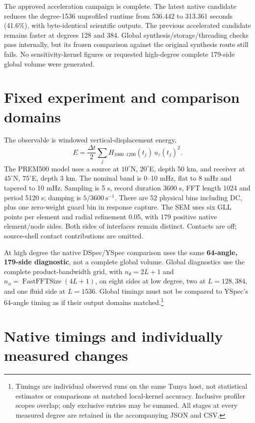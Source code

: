 \documentclass[11pt,a4paper]{article}
\begin{document}
The approved acceleration campaign is complete. The latest native candidate reduces the degree-1536 unprofiled runtime from 536.442 to 313.361 seconds (41.6\%), with byte-identical scientific outputs. The previous accelerated candidate remains faster at degrees 128 and 384. Global synthesis/storage/threading checks pass internally, but its frozen comparison against the original synthesis route still fails. No sensitivity-kernel figures or requested high-degree complete 179-side global volume were generated.
\section{Fixed experiment and comparison domains}
The observable is windowed vertical-displacement energy,
\[
E=\frac{\Delta t}{2}\sum_j H_{1000\text{--}1200}(t_j)\,u_z(t_j)^2.
\]
The PREM500 model uses a source at $10^\circ$N, $20^\circ$E, depth 50 km, and receiver at $45^\circ$N, $75^\circ$E, depth 3 km. The nominal band is 0--10 mHz, flat to 8 mHz and tapered to 10 mHz. Sampling is 5 s, record duration 3600 s, FFT length 1024 and period 5120 s; damping is $5/3600\ \mathrm{s}^{-1}$. There are 52 physical bins including DC, plus one zero-weight guard bin in response capture. The SEM uses six GLL points per element and radial refinement 0.05, with 179 positive native element/node sides. Both sides of interfaces remain distinct. Contacts are off; source-shell contact contributions are omitted.

At high degree the native DSpec/YSpec comparison uses the same \textbf{64-angle, 179-side diagnostic}, not a complete global volume. Global diagnostics use the complete product-bandwidth grid, with $n_\theta=2L+1$ and $n_\phi=\operatorname{FastFFTSize}(4L+1)$, on eight sides at low degree, two at $L=128,384$, and one fluid side at $L=1536$. Global timings must not be compared to YSpec's 64-angle timing as if their output domains matched.\footnote{Timings are individual observed runs on the same Tunya host, not statistical estimates or comparisons at matched local-kernel accuracy. Inclusive profiler scopes overlap; only exclusive entries may be summed. All stages at every measured degree are retained in the accompanying JSON and CSV.}
\section{Native timings and individually measured changes}
\end{document}
